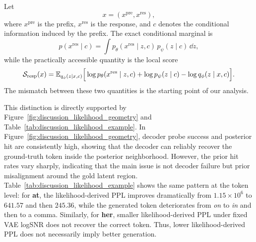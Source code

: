 Let
\[
x=(x^{\mathrm{pre}},x^{\mathrm{res}}),
\]
where $x^{\mathrm{pre}}$ is the prefix, $x^{\mathrm{res}}$ is the response, and $c$ denotes the conditional information induced by the prefix. The exact conditional marginal is
\begin{equation}
p(x^{\mathrm{res}}\mid c)
=
\int p_{\theta}(x^{\mathrm{res}}\mid z,c)\,p_{\psi}(z\mid c)\,\dd z,
\label{eq:resp_conditional_marginal_main_final}
\end{equation}
while the practically accessible quantity is the local score
\begin{equation}
\mathcal S_{\mathrm{resp}}(x)
=
\mathbb{E}_{q_{\phi}(z\mid x,c)}
\Big[
\log p_{\theta}(x^{\mathrm{res}}\mid z,c)
+\log p_{\psi}(z\mid c)
-\log q_{\phi}(z\mid x,c)
\Big].
\label{eq:resp_conditional_score_main_final}
\end{equation}
The mismatch between these two quantities is the starting point of our analysis.


This distinction is directly supported by Figure~\ref{fig:discussion_likelihood_geometry} and Table~\ref{tab:discussion_likelihood_example}. In Figure~\ref{fig:discussion_likelihood_geometry}, decoder probe success and posterior hit are consistently high, showing that the decoder can reliably recover the ground-truth token inside the posterior neighborhood. However, the prior hit rates vary sharply, indicating that the main issue is not decoder failure but prior misalignment around the gold latent region. Table~\ref{tab:discussion_likelihood_example} shows the same pattern at the token level: for \textbf{at}, the likelihood-derived PPL improves dramatically from $1.15\times10^6$ to $641.57$ and then $245.36$, while the generated token deteriorates from \textit{on} to \textit{in} and then to a comma. Similarly, for \textbf{her}, smaller likelihood-derived PPL under fixed VAE logSNR does not recover the correct token. Thus, lower likelihood-derived PPL does not necessarily imply better generation.

